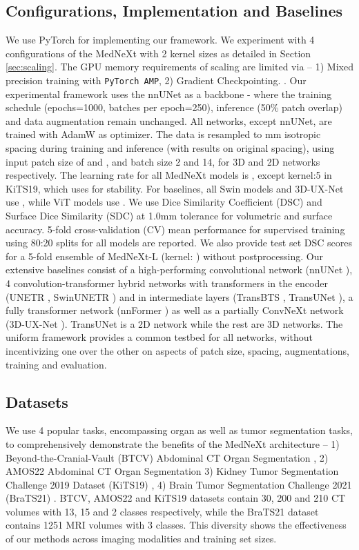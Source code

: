 \documentclass[runningheads]{llncs}
\begin{document}
\subsection{Configurations, Implementation and Baselines}
We use PyTorch \cite{paszke2019pytorch} for implementing our framework. We experiment with 4 configurations of the MedNeXt with 2 kernel sizes as detailed in Section \ref{sec:scaling}. The GPU memory requirements of scaling are limited via -- 1) Mixed precision training with \texttt{PyTorch AMP}, 2) Gradient Checkpointing. \cite{chen2016training}. 
Our experimental framework uses the nnUNet \cite{isensee2021nnu} as a backbone - where the training schedule (epochs=1000, batches per epoch=250), inference (50\% patch overlap) and data augmentation remain unchanged. All networks, except nnUNet, are trained with AdamW \cite{loshchilov2017decoupled} as optimizer. The data is resampled to  mm isotropic spacing during training and inference (with results on original spacing), using input patch size of  and , and batch size 2 and 14, for 3D and 2D networks respectively. The learning rate for all MedNeXt models is , except kernel:5 in KiTS19, which uses  for stability. For baselines, all Swin models and 3D-UX-Net use , while ViT models use . We use Dice Similarity Coefficient (DSC) and Surface Dice Similarity (SDC) at 1.0mm tolerance for volumetric and surface accuracy. 5-fold cross-validation (CV) mean performance for supervised training using 80:20 splits for all models are reported. We also provide test set DSC scores for a 5-fold ensemble of MedNeXt-L (kernel: ) without postprocessing. Our extensive baselines consist of a high-performing convolutional network (nnUNet \cite{isensee2021nnu}), 4 convolution-transformer hybrid networks with transformers in the encoder (UNETR \cite{hatamizadeh2022unetr}, SwinUNETR \cite{hatamizadeh2022swin}) and in intermediate layers (TransBTS \cite{wang2021transbts}, TransUNet \cite{chen2021transunet}), a fully transformer network (nnFormer \cite{zhou2021nnformer}) as well as a partially ConvNeXt network (3D-UX-Net \cite{lee20223d}). TransUNet is a 2D network while the rest are 3D networks. The uniform framework provides a common testbed for all networks, without incentivizing one over the other on aspects of patch size, spacing, augmentations, training and evaluation.

\subsection{Datasets}
We use 4 popular tasks, encompassing organ as well as tumor segmentation tasks, to comprehensively demonstrate the benefits of the MedNeXt architecture -- 1) Beyond-the-Cranial-Vault (BTCV) Abdominal CT Organ Segmentation \cite{landman2015miccai}, 2) AMOS22 Abdominal CT Organ Segmentation \cite{ji2022amos} 3) Kidney Tumor Segmentation Challenge 2019 Dataset (KiTS19) \cite{heller2020state}, 4) Brain Tumor Segmentation Challenge 2021 (BraTS21) \cite{baid2021rsna}. BTCV, AMOS22 and KiTS19 datasets contain 30, 200 and 210 CT volumes with 13, 15 and 2 classes respectively, while the BraTS21 dataset contains 1251 MRI volumes with 3 classes. This diversity shows the effectiveness of our methods across imaging modalities and training set sizes.
\end{document}
